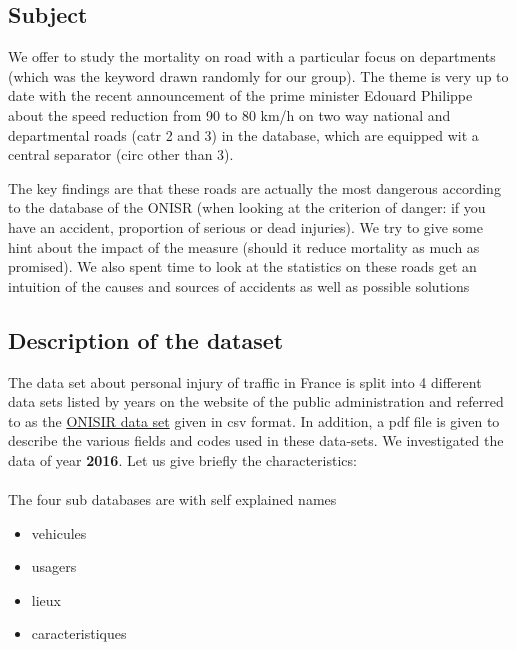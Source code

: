 \documentclass[a4paper]{article}
\theoremstyle{definition}
\theoremstyle{proposition}
\begin{document}
\subsection{Subject}
We offer to study the mortality on road with a particular focus on departments (which was the keyword drawn randomly for our group). The theme is very up to date with the recent announcement of the prime minister Edouard Philippe about the speed reduction from 90 to 80 km/h on two way national and departmental roads (catr 2 and 3) in the database, which are equipped wit a central separator (circ other than 3).

The key findings are that these roads are actually the most dangerous according to the database of the ONISR (when looking at the criterion of danger: if you have an accident, proportion of serious or dead injuries). We try to give some hint about the impact of the measure (should it reduce mortality as much as promised). We also spent time to look at the statistics on these roads get an intuition of the causes and sources of accidents as well as possible solutions

\subsection{Description of the dataset}
The data set about personal injury of traffic in France is split into 4 different data sets listed by years on the website of the public administration and referred to as the  \href{https://www.data.gouv.fr/fr/datasets/base-de-donnees-accidents-corporels-de-la-circulation/}{ONISIR data set} given in csv format. In addition, a pdf file is given to describe the various fields and codes used in these data-sets. We investigated the data of year \textbf{2016}. Let us give briefly the characteristics:
\\
\\
The four sub databases are with self explained names
\begin{itemize}
\item vehicules
\item usagers
\item lieux
\item caracteristiques
\end{itemize}
\end{document}
